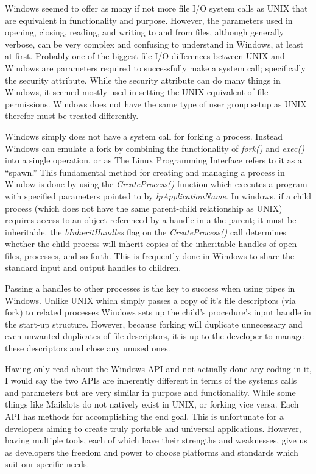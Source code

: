 \documentclass[11pt]{report}
\begin{document}
Windows seemed to offer as many if not more file I/O system calls as UNIX that are equivalent in functionality and purpose. However, the parameters used in opening, closing, reading, and writing to and from files, although generally verbose, can be very complex and confusing to understand in Windows, at least at first. Probably one of the biggest file I/O differences between UNIX and Windows  are parameters required to successfully make a system call; specifically the security attribute. While the security attribute can do many things in Windows, it seemed mostly used in setting the UNIX equivalent of file permissions. Windows does not have the same type of user group setup as UNIX therefor must be treated differently.

Windows simply does not have a system call for forking a process. Instead Windows can emulate a fork by combining the functionality of \textit{fork()} and \textit{exec()} into a single operation, or as The Linux Programming Interface refers to it as a “spawn.” This fundamental method for creating and managing a process in Window is done by using the \textit{CreateProcess()} function which executes a program with specified parameters pointed to by \textit{lpApplicationName}. In windows, if a child process (which does not have the same parent-child relationship as UNIX) requires access to an object referenced by a handle in a the parent; it must be inheritable. the \textit{bInheritHandles} flag on the \textit{CreateProcess()} call determines whether the child process will inherit copies of the inheritable handles of open files, processes, and so forth. This is frequently done in Windows to share the standard input and output handles to children.

Passing a handles to other processes is the key to success when using pipes in Windows. Unlike UNIX which simply passes a copy of it’s file descriptors (via fork) to related processes Windows sets up the child’s procedure’s input handle in the start-up structure. However, because forking will duplicate unnecessary and even unwanted duplicates of file descriptors, it is up to the developer to manage these descriptors and close any unused ones.

Having only read about the Windows API and not actually done any coding in it, I would say the two APIs are inherently different in terms of the systems calls and parameters but are very similar in purpose and functionality. While some things like Mailslots do not natively exist in UNIX, or forking vice versa. Each API has methods for accomplishing the end goal. This is unfortunate for a developers aiming to create truly portable and universal applications. However, having multiple tools, each of which have their strengths and weaknesses, give us as developers the freedom and power to choose platforms and standards which suit our specific needs.
\end{document}
